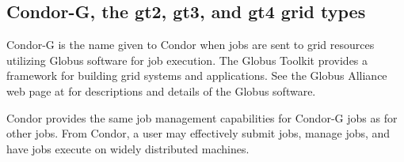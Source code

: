 
\subsection{\label{sec:Condor-G}Condor-G, the gt2, gt3, and gt4 grid types}

Condor-G is the name given to Condor when 
 jobs are sent to grid resources utilizing
Globus software for job execution.
The Globus Toolkit provides a framework for building grid systems
and applications.
See the Globus Alliance web page at
for descriptions and details of the Globus software.

Condor provides the same job management capabilities for Condor-G
jobs as for other jobs.
From Condor, a user may effectively submit jobs, manage jobs,
and have jobs execute on widely distributed machines.



